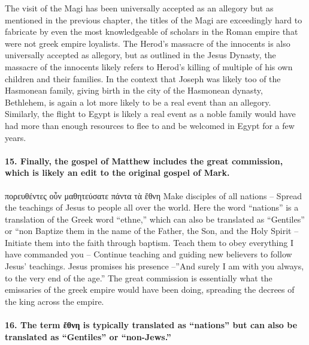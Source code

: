 The visit of the Magi has been universally accepted as an allegory but as mentioned in the previous chapter, the titles of the Magi are exceedingly hard to fabricate by even the most knowledgeable of scholars in the Roman empire that were not greek empire loyalists.
The Herod's massacre of the innocents is also universally accepted as allegory, but as outlined in the Jesus Dynasty, the massacre of the innocents likely refers to Herod's killing of multiple of his own children and their families.
In the context that Joseph was likely too of the Hasmonean family, giving birth in the city of the Hasmonean dynasty, Bethlehem, is again a lot more likely to be a real event than an allegory.
Similarly, the flight to Egypt is likely a real event as a noble family would have had more than enough resources to flee to and be welcomed in Egypt for a few years.

\paragraph{15.
Finally, the gospel of Matthew includes the great commission, which is likely an edit to the original gospel of Mark.}\label{par:finally-the-gospel-of-matthew-includes-the-great-commission-which-is-likely-an-edit-to-the-original-gospel-of-mark.}

πορευθέντες οὖν μαθητεύσατε πάντα τὰ ἔθνη Make disciples of all nations -- Spread the teachings of Jesus to people all over the world.
Here the word ``nations'' is a translation of the Greek word ``ethne,'' which can also be translated as ``Gentiles'' or ``non Baptize them in the name of the Father, the Son, and the Holy Spirit -- Initiate them into the faith through baptism.
Teach them to obey everything I have commanded you -- Continue teaching and guiding new believers to follow Jesus' teachings.
Jesus promises his presence --''And surely I am with you always, to the very end of the age.'' The great commission is essentially what the emissaries of the greek empire would have been doing, spreading the decrees of the king across the empire.

\paragraph{16.
The term ἔθνη is typically translated as ``nations'' but can also be translated as ``Gentiles'' or ``non-Jews.''}\label{par:the-term-ux1f14ux3b8ux3bdux3b7-is-typically-translated-as-nations-but-can-also-be-translated-as-gentiles-or-non-jews.}

